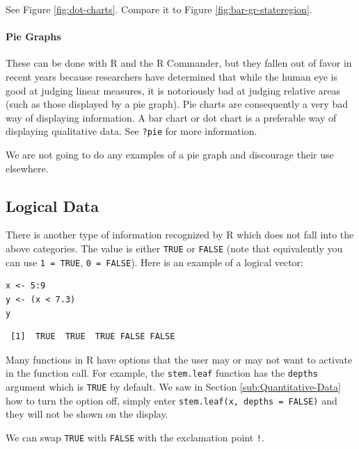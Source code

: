 \documentclass[captions=tableheading]{scrbook}
\begin{document}
\begin{example}
See Figure \ref{fig:dot-charts}. Compare it to Figure \ref{fig:bar-gr-stateregion}.

\end{example}

\paragraph*{Pie Graphs}
\label{par:Pie-Graphs}

These can be done with \textsf{R} and the \textsf{R} Commander, but they fallen out of favor in recent years because researchers have determined that while the human eye is good at judging linear measures, it is notoriously bad at judging relative areas (such as those displayed by a pie graph). Pie charts are consequently a very bad way of displaying information. A bar chart or dot chart is a preferable way of displaying qualitative data. See \texttt{?pie} for more information.

We are not going to do any examples of a pie graph and discourage their use elsewhere. 
\subsection{Logical Data}
\label{sec-2-1-5}

\label{sub:Logical-Data}

There is another type of information recognized by \textsf{R} which does not fall into the above categories. The value is either \texttt{TRUE} or \texttt{FALSE} (note that equivalently you can use \texttt{1 = TRUE}, \texttt{0 = FALSE}). Here is an example of a logical vector:


\begin{verbatim}
x <- 5:9
y <- (x < 7.3)
y
\end{verbatim}

\begin{verbatim}
 [1]  TRUE  TRUE  TRUE FALSE FALSE
\end{verbatim}

Many functions in \textsf{R} have options that the user may or may not want to activate in the function call. For example, the \texttt{stem.leaf} function has the \texttt{depths} argument which is \texttt{TRUE} by default. We saw in Section \ref{sub:Quantitative-Data} how to turn the option off, simply enter \texttt{stem.leaf(x, depths = FALSE)} and they will not be shown on the display.

We can swap \texttt{TRUE} with \texttt{FALSE} with the exclamation point \texttt{!}.
\end{document}
